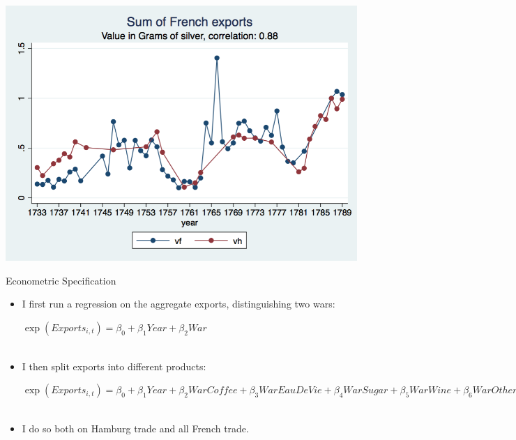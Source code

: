 \documentclass[11pt]{beamer}
\begin{document}
\begin{frame}
\begin{center}
\includegraphics[scale=.3]{long_evolution.png}
\end{center}

\end{frame}

\begin{frame}{Econometric Specification}
\begin{itemize}
\item{I first run a regression on the aggregate exports, distinguishing two wars:
\begin{center}
$\exp(Exports_{i,t})=\beta_0+\beta_1Year+\beta_2War$\\~\\
\end{center} }
\item{I then split exports into  different products:
\begin{center}
$\exp(Exports_{i,t})=\beta_0+\beta_1Year+\beta_2WarCoffee + \beta_3WarEauDeVie+\beta_4WarSugar +\beta_5WarWine +\beta_6WarOther$ \\~\\
\end{center}}
\item{I do so both on Hamburg trade and all French trade.}
\end{itemize}
\end{frame}
\end{document}
